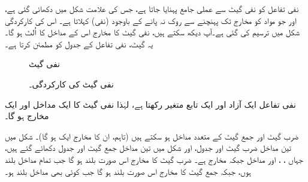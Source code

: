 نفی تفاعل کو نفی گیٹ سے عملی جامع پہنایا جاتا ہے، جس کی علامت شکل  میں دکھائی گئی ہے، اور جو مواد کو مخارج تک پہنچنے سے روک نہ پانے کے باوجود (نفی)  کہلاتا ہے۔ اس کی کارکردگی شکل  میں ترسیم کی گئی ہے۔آپ دیکھ سکتے ہیں، نفی گیٹ کا مخارج اس کے مداخل کا اُلٹ ہو گا۔ یہ گیٹ، نفی تفاعل کے جدول کو مطمئن کرتا ہے۔

\begin{figure}
\centering
\begin{minipage}[b]{0.4\textwidth}
\centering
{}
\caption{نفی گیٹ}
\label{شکل_بوولین_نفی_گیٹ}
\end{minipage}\hfill
\begin{minipage}[b]{0.6\textwidth}
\centering
{}
\caption{نفی گیٹ کی کارکردگی۔}
\label{شکل_بوولین_نفی_کارکردگی}
\end{minipage}
\end{figure}

نفی تفاعل ایک آزاد اور ایک تابع متغیر رکھتا ہے، لہٰذا نفی گیٹ کا ایک مداخل اور ایک مخارج ہو گا۔

 ضرب گیٹ اور جمع گیٹ کے متعدد مداخل ہو سکتے ہیں (تاہم، ان کا مخارج ایک ہو گا)۔ شکل  میں تین مداخل ضرب گیٹ اور جدول، اور شکل  میں تین مداخل جمع گیٹ اور جدول دکھائے گئے ہیں، جہاں ، ، اور  مداخل جبکہ  مخارج ہے۔ ضرب گیٹ کا مخارج اس صورت بلند ہو گا جب تمام مداخل بلند ہوں، جبکہ جمع گیٹ کا مخارج اس صورت بلند ہو گا جب کوئی بھی مداخل بلند ہو۔
 
